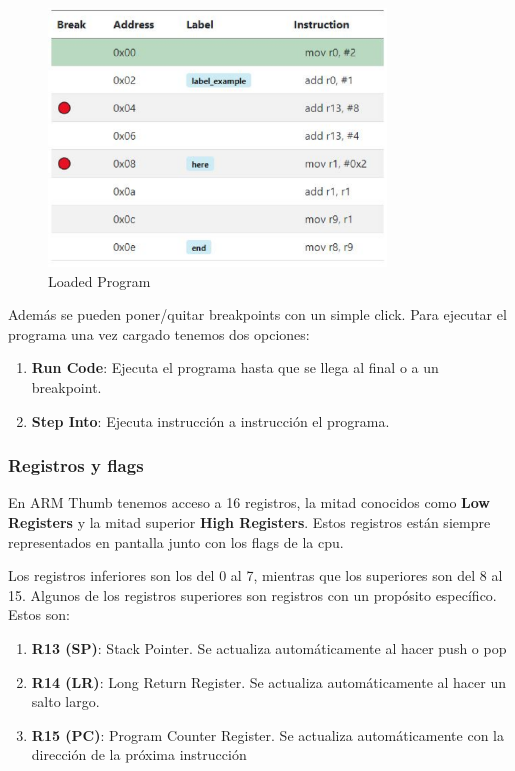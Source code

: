 {{            \begin{figure}[h]
                \centering
                \includegraphics[width=0.8\textwidth, height=0.35\textheight]{images/programa}
                \caption{Loaded Program}
            \end{figure}
            
            Además se pueden poner/quitar breakpoints con un simple click. Para ejecutar el programa una vez cargado tenemos dos opciones:
            \begin{enumerate}
                \item \textbf{Run Code}: Ejecuta el programa hasta que se llega al final o a un breakpoint.
                \item \textbf{Step Into}: Ejecuta instrucción a instrucción el programa.
            \end{enumerate}
        }

        \subsubsection{Registros y flags}
        {
            En ARM Thumb tenemos acceso a 16 registros, la mitad conocidos como \textbf{Low Registers} y la mitad superior \textbf{High Registers}.
            Estos registros están siempre representados en pantalla junto con los flags de la cpu. 

            Los registros inferiores son los del 0 al 7, mientras que los superiores son del 8 al 15.
            Algunos de los registros superiores son registros con un propósito específico. Estos son:
            \begin{enumerate}
                \item \textbf{R13 (SP)}: Stack Pointer. Se actualiza automáticamente al hacer push o pop
                \item \textbf{R14 (LR)}: Long Return Register. Se actualiza automáticamente al hacer un salto largo.
                \item \textbf{R15 (PC)}: Program Counter Register. Se actualiza automáticamente con la dirección de la próxima instrucción
            \end{enumerate}
            \clearpage

}}
